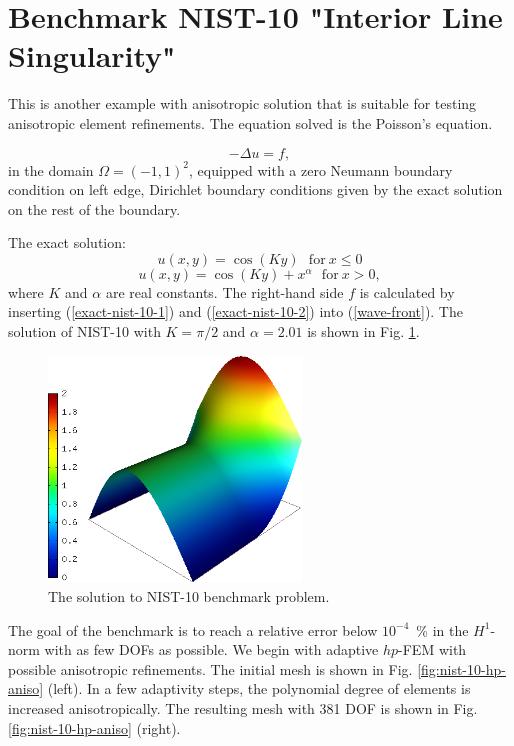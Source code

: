 \section{Benchmark NIST-10 "Interior Line Singularity"}
\label{sec:bench-10}

This is another example with anisotropic solution that is suitable for testing
anisotropic element refinements. The equation solved is the Poisson's equation.

\begin{equation} \label{interior}
-\Delta u = f,
\end{equation}
in the domain $\Omega = (-1, 1)^2$, equipped with a zero
Neumann boundary condition on left edge, Dirichlet boundary conditions given by the exact solution on the rest of the boundary.

The exact solution:
\begin{equation}\label{exact-nist-10-1}
u(x,y) = \cos(Ky)\ \ \ \mbox{for}\ x \le 0
\end{equation}
\begin{equation}\label{exact-nist-10-2}
u(x,y) = \cos(Ky) + x^{\alpha}\ \ \ \mbox{for}\ x > 0,
\end{equation}
where $K$ and $\alpha$ are real constants.
The right-hand side $f$ is calculated by inserting
(\ref{exact-nist-10-1}) and (\ref{exact-nist-10-2}) into (\ref{wave-front}).
The solution of NIST-10 with $K = \pi/2$ and
$\alpha = 2.01$ is shown in Fig. \ref{fig:sln-nist10}.

\begin{figure}[!ht]
\centering
\includegraphics[height=6cm]{nist/nist-10/solution.png}
\caption{The solution to NIST-10 benchmark problem.}
\label{fig:sln-nist10}
\end{figure}

The goal of the benchmark is to reach a relative error below
$10^{-4}$~\% in the $H^1$-norm with as few DOFs as possible.
We begin with adaptive $hp$-FEM with possible anisotropic refinements.
The initial mesh is shown in Fig. \ref{fig:nist-10-hp-aniso} (left).
In a few adaptivity steps, the polynomial degree of elements is increased
anisotropically.
The resulting mesh with 381 DOF is shown in Fig. \ref{fig:nist-10-hp-aniso} (right).

